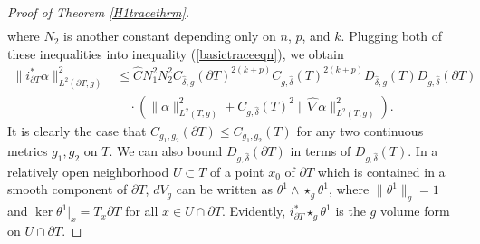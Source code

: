 \documentclass[11pt]{article}
\begin{document}
\begin{proof}[Proof of Theorem \ref{H1tracethrm}]
\begin{align*}
\end{align*}
where $N_2$ is another constant depending only on $n$, $p$, and $k$.
Plugging both of these inequalities into inequality (\ref{basictraceeqn}), we obtain
\begin{equation}\label{H1traceintermediate1}
\begin{split}
\|i_{\partial T}^*\alpha\|^2_{L^2(\partial T, g)} &\le \hat C N_1^2N_2^2C_{\hat \delta,g}(\partial T)^{2(k+p)}C_{g,\hat \delta}(T)^{2(k+p)}D_{\hat \delta,g}(T)D_{g,\hat \delta}(\partial T) \\ &\quad\cdot \left(\|\alpha\|_{L^2(T,g)}^2 + C_{g,\hat \delta}(T)^2\|\hat\nabla\alpha\|_{L^2(T,g)}^2\right).
\end{split}
\end{equation}
It is clearly the case that $C_{g_1,g_2}(\partial T) \le C_{g_1,g_2}(T)$ for any two continuous metrics $g_1, g_2$ on $T$. We can also bound $D_{g,\hat \delta}(\partial T)$ in terms of $D_{g,\hat \delta}(T)$. In a relatively open neighborhood $U \subset T$ of a point $x_0$ of $\partial T$ which is contained in a smooth component of $\partial T$, $dV_{g}$ can be written as $\theta^1\wedge\star_g\theta^1$, where $\|\theta^1\|_g = 1$ and $\ker \theta^1|_x = T_x\partial T$ for all $x \in U \cap \partial T$. Evidently, $i_{\partial T}^*\star_g \theta^1$ is the $g$ volume form on $U \cap \partial T$.


\end{proof}
\end{document}
